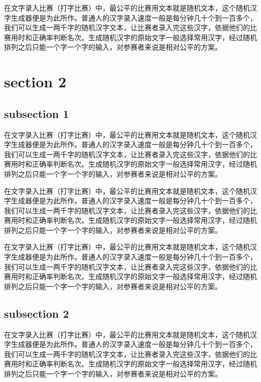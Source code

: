 \documentclass[12pt,hyperref,UTF8]{ctexbook}
\begin{document}
在文字录入比赛（打字比赛）中，最公平的比赛用文本就是随机文本，这个随机汉字生成器便是为此所作。普通人的汉字录入速度一般是每分钟几十个到一百多个，我们可以生成一两千字的随机汉字文本，让比赛者录入完这些汉字，依据他们的比赛用时和正确率判断名次。生成随机汉字的原始文字一般选择常用汉字，经过随机排列之后只能一个字一个字的输入，对参赛者来说是相对公平的方案。

\section{section 2}

\subsection{subsection 1}

在文字录入比赛（打字比赛）中，最公平的比赛用文本就是随机文本，这个随机汉字生成器便是为此所作。普通人的汉字录入速度一般是每分钟几十个到一百多个，我们可以生成一两千字的随机汉字文本，让比赛者录入完这些汉字，依据他们的比赛用时和正确率判断名次。生成随机汉字的原始文字一般选择常用汉字，经过随机排列之后只能一个字一个字的输入，对参赛者来说是相对公平的方案。

在文字录入比赛（打字比赛）中，最公平的比赛用文本就是随机文本，这个随机汉字生成器便是为此所作。普通人的汉字录入速度一般是每分钟几十个到一百多个，我们可以生成一两千字的随机汉字文本，让比赛者录入完这些汉字，依据他们的比赛用时和正确率判断名次。生成随机汉字的原始文字一般选择常用汉字，经过随机排列之后只能一个字一个字的输入，对参赛者来说是相对公平的方案。

在文字录入比赛（打字比赛）中，最公平的比赛用文本就是随机文本，这个随机汉字生成器便是为此所作。普通人的汉字录入速度一般是每分钟几十个到一百多个，我们可以生成一两千字的随机汉字文本，让比赛者录入完这些汉字，依据他们的比赛用时和正确率判断名次。生成随机汉字的原始文字一般选择常用汉字，经过随机排列之后只能一个字一个字的输入，对参赛者来说是相对公平的方案。

\subsection{subsection 2}

在文字录入比赛（打字比赛）中，最公平的比赛用文本就是随机文本，这个随机汉字生成器便是为此所作。普通人的汉字录入速度一般是每分钟几十个到一百多个，我们可以生成一两千字的随机汉字文本，让比赛者录入完这些汉字，依据他们的比赛用时和正确率判断名次。生成随机汉字的原始文字一般选择常用汉字，经过随机排列之后只能一个字一个字的输入，对参赛者来说是相对公平的方案。
\end{document}
